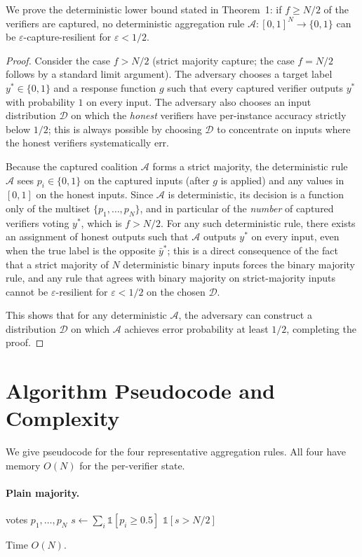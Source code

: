 \documentclass[11pt]{article}
\newcommand{\A}{\mathcal{A}}            %
\begin{document}
We prove the deterministic lower bound stated in Theorem~1: if
$f \geq N/2$ of the verifiers are captured, no deterministic
aggregation rule $\mathcal{A}: [0,1]^N \to \{0,1\}$ can be
$\varepsilon$-capture-resilient for $\varepsilon < 1/2$.

\begin{proof}
Consider the case $f > N/2$ (strict majority capture; the case
$f = N/2$ follows by a standard limit argument). The adversary
chooses a target label $y^* \in \{0,1\}$ and a response function
$g$ such that every captured verifier outputs $y^*$ with
probability $1$ on every input. The adversary also chooses an input
distribution $\mathcal{D}$ on which the \emph{honest} verifiers have
per-instance accuracy strictly below $1/2$; this is always possible
by choosing $\mathcal{D}$ to concentrate on inputs where the honest
verifiers systematically err.

Because the captured coalition $\A$ forms a strict majority, the
deterministic rule $\mathcal{A}$ sees $p_i \in \{0, 1\}$ on the
captured inputs (after $g$ is applied) and any values in $[0,1]$ on
the honest inputs. Since $\mathcal{A}$ is deterministic, its
decision is a function only of the multiset $\{p_1, \ldots, p_N\}$,
and in particular of the \emph{number} of captured verifiers voting
$y^*$, which is $f > N/2$. For any such deterministic rule, there
exists an assignment of honest outputs such that $\mathcal{A}$ outputs
$y^*$ on every input, even when the true label is the opposite
$\bar{y}^*$; this is a direct consequence of the fact that a strict
majority of $N$ deterministic binary inputs forces the binary
majority rule, and any rule that agrees with binary majority on
strict-majority inputs cannot be $\varepsilon$-resilient for
$\varepsilon < 1/2$ on the chosen $\mathcal{D}$.

This shows that for any deterministic $\mathcal{A}$, the adversary
can construct a distribution $\mathcal{D}$ on which $\mathcal{A}$
achieves error probability at least $1/2$, completing the proof.
\end{proof}

\section{Algorithm Pseudocode and Complexity}
\label{app:algo}

We give pseudocode for the four representative aggregation rules.
All four have memory $O(N)$ for the per-verifier state.

\paragraph{Plain majority.}
\begin{algorithmic}[1]
\Require votes $p_1, \ldots, p_N$
\State $s \gets \sum_i \mathbb{1}[p_i \geq 0.5]$
\State \Return $\mathbb{1}[s > N/2]$
\end{algorithmic}
Time $O(N)$.
\end{document}
